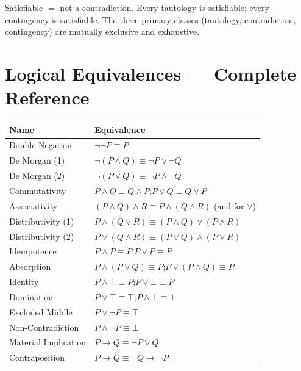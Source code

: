 \begin{remark}
Satisfiable $=$ not a contradiction.
Every tautology is satisfiable; every contingency is satisfiable.
The three primary classes (tautology, contradiction, contingency) are mutually
exclusive and exhaustive.
\end{remark}

\section*{Logical Equivalences — Complete Reference}

\begin{center}
\renewcommand{\arraystretch}{1.3}
\begin{tabular}{l l}
\toprule
\textbf{Name} & \textbf{Equivalence} \\
\midrule
Double Negation       & $\neg\neg P \equiv P$ \\
De Morgan (1)         & $\neg(P \wedge Q) \equiv \neg P \vee \neg Q$ \\
De Morgan (2)         & $\neg(P \vee Q) \equiv \neg P \wedge \neg Q$ \\
Commutativity         & $P \wedge Q \equiv Q \wedge P$;\quad $P \vee Q \equiv Q \vee P$ \\
Associativity         & $(P \wedge Q) \wedge R \equiv P \wedge (Q \wedge R)$ (and for $\vee$) \\
Distributivity (1)    & $P \wedge (Q \vee R) \equiv (P \wedge Q) \vee (P \wedge R)$ \\
Distributivity (2)    & $P \vee (Q \wedge R) \equiv (P \vee Q) \wedge (P \vee R)$ \\
Idempotence           & $P \wedge P \equiv P$;\quad $P \vee P \equiv P$ \\
Absorption            & $P \wedge (P \vee Q) \equiv P$;\quad $P \vee (P \wedge Q) \equiv P$ \\
Identity              & $P \wedge \top \equiv P$;\quad $P \vee \bot \equiv P$ \\
Domination            & $P \vee \top \equiv \top$;\quad $P \wedge \bot \equiv \bot$ \\
Excluded Middle       & $P \vee \neg P \equiv \top$ \\
Non-Contradiction     & $P \wedge \neg P \equiv \bot$ \\
Material Implication  & $P \rightarrow Q \equiv \neg P \vee Q$ \\
Contraposition        & $P \rightarrow Q \equiv \neg Q \rightarrow \neg P$ \\

\end{tabular}
\end{center}
